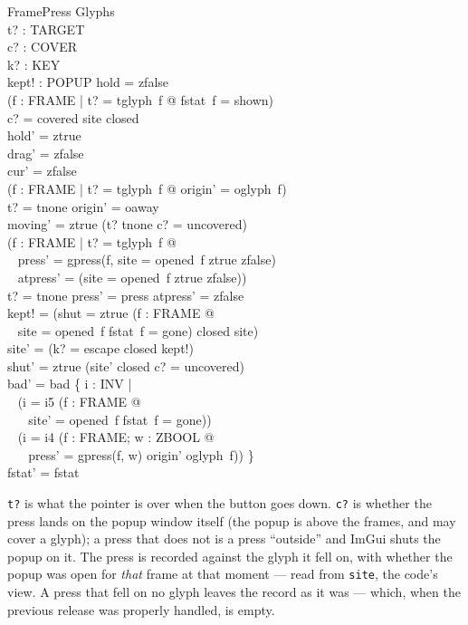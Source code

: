 \documentclass[a4paper,10pt,fleqn]{article}
\begin{document}
\begin{schema}{FramePress}
  \Delta Glyphs \\
  t? : TARGET \\
  c? : COVER \\
  k? : KEY \\
  kept! : POPUP
\where
  hold = zfalse \\
  (\forall f : FRAME | t? = tglyph~f @ fstat~f = shown) \\
  c? = covered \implies site \neq closed \\
  hold' = ztrue \\
  drag' = zfalse \\
  cur' = zfalse \\
  (\forall f : FRAME | t? = tglyph~f @ origin' = oglyph~f) \\
  t? = tnone \implies origin' = oaway \\
  moving' = ztrue \iff (t? \neq tnone \land c? = uncovered) \\
  (\forall f : FRAME | t? = tglyph~f @ \\
  \quad~ press' = gpress(f, \IF site = opened~f \THEN ztrue \ELSE zfalse) \\
  \quad~ \land atpress' = (\IF site = opened~f \THEN ztrue \ELSE zfalse)) \\
  t? = tnone \implies press' = press \land atpress' = zfalse \\
  kept! = (\IF shut = ztrue \lor (\exists f : FRAME @ \\
  \quad~ site = opened~f \land fstat~f = gone) \THEN closed \ELSE site) \\
  site' = (\IF k? = escape \THEN closed \ELSE kept!) \\
  shut' = ztrue \iff (site' \neq closed \land c? = uncovered) \\
  bad' = bad \cup \{ i : INV | \\
  \quad~ (i = i5 \land (\exists f : FRAME @ \\
  \quad~ \quad~ site' = opened~f \land fstat~f = gone)) \\
  \quad~ \lor (i = i4 \land (\exists f : FRAME; w : ZBOOL @ \\
  \quad~ \quad~ press' = gpress(f, w) \land origin' \neq oglyph~f)) \} \\
  fstat' = fstat
\end{schema}

\texttt{t?} is what the pointer is over when the button goes down.  \texttt{c?}
is whether the press lands on the popup window itself (the popup is above the
frames, and may cover a glyph); a press that does not is a press ``outside''
and ImGui shuts the popup on it.  The press is recorded against the glyph it
fell on, with whether the popup was open for \emph{that} frame at that moment
--- read from \texttt{site}, the code's view.  A press that fell on no glyph
leaves the record as it was --- which, when the previous release was properly
handled, is empty.
\end{document}
